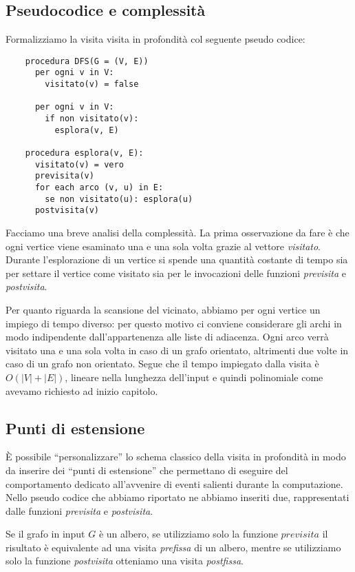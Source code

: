 \subsection{Pseudocodice e complessit\`a}
Formalizziamo la visita visita in profondit\`a col seguente pseudo
codice:
\begin{lstlisting}
    procedura DFS(G = (V, E))
      per ogni v in V:
        visitato(v) = false

      per ogni v in V:
        if non visitato(v):
          esplora(v, E)

    procedura esplora(v, E):
      visitato(v) = vero
      previsita(v)
      for each arco (v, u) in E:
        se non visitato(u): esplora(u)
      postvisita(v)
\end{lstlisting}

Facciamo una breve analisi della complessit\`a. La prima osservazione
da fare \`e che ogni vertice viene esaminato una e una sola volta
grazie al vettore \emph{visitato}. Durante l'esplorazione di un
vertice si spende una quantit\`a costante di tempo sia per settare il
vertice come visitato sia per le invocazioni delle funzioni
\emph{previsita} e \emph{postvisita}. 

Per quanto riguarda la scansione del vicinato, abbiamo per ogni
vertice un impiego di tempo diverso: per questo motivo ci conviene
considerare gli archi in modo indipendente dall'appartenenza alle
liste di adiacenza. Ogni arco verr\`a visitato una e una sola volta in
caso di un grafo orientato, altrimenti due volte in caso di un grafo
non orientato. Segue che il tempo impiegato dalla visita \`e $O(|V| +
|E|)$, lineare nella lunghezza dell'input e quindi polinomiale come
avevamo richiesto ad inizio capitolo.

\subsection{Punti di estensione}
\`E possibile ``personalizzare'' lo schema classico della visita in
profondit\`a in modo da inserire dei ``punti di estensione'' che
permettano di eseguire del comportamento dedicato all'avvenire di
eventi salienti durante la computazione. Nello pseudo codice che
abbiamo riportato ne abbiamo inseriti due, rappresentati dalle
funzioni \emph{previsita} e \emph{postvisita}.

Se il grafo in input $G$ \`e un albero, se utilizziamo solo la
funzione $previsita$ il risultato \`e equivalente ad una visita
\emph{prefissa} di un albero, mentre se utilizziamo solo la funzione
\emph{postvisita} otteniamo una visita \emph{postfissa}.

